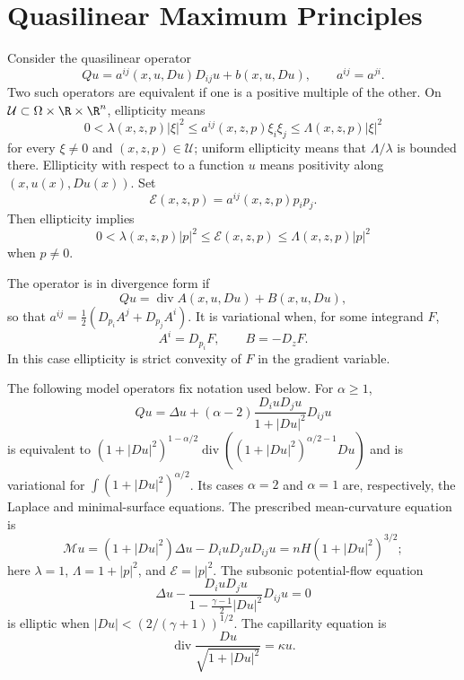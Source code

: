 \chapter{Quasilinear Maximum Principles}

Consider the quasilinear operator
\begin{equation}
Qu=a^{ij}(x,u,Du)D_{ij}u+b(x,u,Du),
\qquad a^{ij}=a^{ji}.
\tag{10.1}
\end{equation}
Two such operators are equivalent if one is a positive multiple of the other.
On $\mathcal U\subset\Omega\times\R\times\R^n$, ellipticity means
\begin{equation}
0<\lambda(x,z,p)|\xi|^2
\le a^{ij}(x,z,p)\xi_i\xi_j
\le\Lambda(x,z,p)|\xi|^2
\tag{10.2}
\end{equation}
for every $\xi\ne0$ and $(x,z,p)\in\mathcal U$; uniform ellipticity means
that $\Lambda/\lambda$ is bounded there.  Ellipticity with respect to a
function $u$ means positivity along $(x,u(x),Du(x))$.  Set
\begin{equation}
\mathcal E(x,z,p)=a^{ij}(x,z,p)p_ip_j.
\tag{10.3}
\end{equation}
Then ellipticity implies
\begin{equation}
0<\lambda(x,z,p)|p|^2\le\mathcal E(x,z,p)
\le\Lambda(x,z,p)|p|^2
\tag{10.4}
\end{equation}
when $p\ne0$.

The operator is in divergence form if
\begin{equation}
Qu=\operatorname{div}A(x,u,Du)+B(x,u,Du),
\tag{10.5}
\end{equation}
so that
$a^{ij}=\tfrac12(D_{p_i}A^j+D_{p_j}A^i)$.  It is variational when, for
some integrand $F$,
\begin{equation}
A^i=D_{p_i}F,\qquad B=-D_zF.
\tag{10.6}
\end{equation}
In this case ellipticity is strict convexity of $F$ in the gradient variable.

The following model operators fix notation used below.  For $\alpha\ge1$,
\[
Qu=\Delta u+(\alpha-2)\frac{D_iuD_ju}{1+|Du|^2}D_{ij}u
\]
is equivalent to
$(1+|Du|^2)^{1-\alpha/2}\operatorname{div}
((1+|Du|^2)^{\alpha/2-1}Du)$ and is variational for
$\int(1+|Du|^2)^{\alpha/2}$.  Its cases $\alpha=2$ and $\alpha=1$ are,
respectively, the Laplace and minimal-surface equations.  The prescribed
mean-curvature equation is
\begin{equation}
\mathcal Mu=(1+|Du|^2)\Delta u-D_iuD_juD_{ij}u
=nH(1+|Du|^2)^{3/2};
\tag{10.7}
\end{equation}
here $\lambda=1$, $\Lambda=1+|p|^2$, and $\mathcal E=|p|^2$.
The subsonic potential-flow equation
\begin{equation}
\Delta u-
\frac{D_iuD_ju}{1-\frac{\gamma-1}{2}|Du|^2}D_{ij}u=0
\tag{10.8}
\end{equation}
is elliptic when $|Du|<(2/(\gamma+1))^{1/2}$.  The capillarity equation is
\begin{equation}
\operatorname{div}\frac{Du}{\sqrt{1+|Du|^2}}=\kappa u.
\tag{10.9}
\end{equation}

